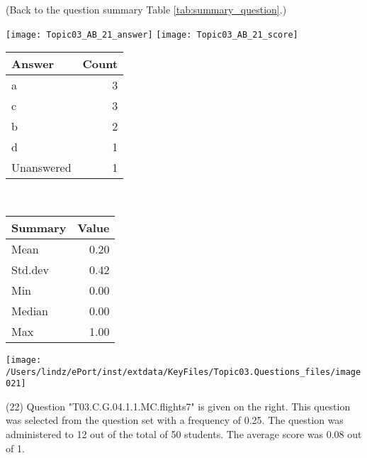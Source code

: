 \documentclass[12pt,english,nohyper]{tufte-handout}\usepackage[]{graphicx}\usepackage[]{color}
\begin{document}
 (Back to the question summary Table \ref{tab:summary_question}.)

\begin{center} \texttt{[image: Topic03\_AB\_21\_answer]} \texttt{[image: Topic03\_AB\_21\_score]} \end{center} 

\begin{center}%
\begin{tabular}{lr}
  \hline
Answer & Count \\ 
  \hline
a &   3 \\ 
  c &   3 \\ 
  b &   2 \\ 
  d &   1 \\ 
  Unanswered &   1 \\ 
   \hline
\end{tabular}
~~~~~~~~%
\begin{tabular}{lr}
  \hline
Summary & Value \\ 
  \hline
Mean & 0.20 \\ 
  Std.dev & 0.42 \\ 
  Min & 0.00 \\ 
  Median & 0.00 \\ 
  Max & 1.00 \\ 
   \hline
\end{tabular}
\end{center}\newpage{}



\vspace{4cm}\begin{marginfigure}\texttt{[image: /Users/lindz/ePort/inst/extdata/KeyFiles/Topic03.Questions\_files/image021]}\end{marginfigure}\vspace{-4cm} (22) Question "T03.C.G.04.1.1.MC.flights7" is given on the right. This question was selected from the question set with a frequency of 0.25. The question was administered to 12 out of the total of 50 students. The average score was 0.08 out of 1.
\end{document}
